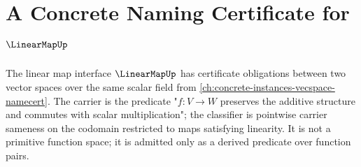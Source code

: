 \chapter{A Concrete Naming Certificate for \(\LinearMapUp\)}
\label{ch:concrete-instances-linearmap-namecert}

The linear map interface \(\LinearMapUp\) has certificate obligations between two vector spaces over the same scalar field from \autoref{ch:concrete-instances-vecspace-namecert}. The carrier is the predicate "\(f : V \to W\) preserves the additive structure and commutes with scalar multiplication"; the classifier is pointwise carrier sameness on the codomain restricted to maps satisfying linearity. It is not a primitive function space; it is admitted only as a derived predicate over function pairs.












